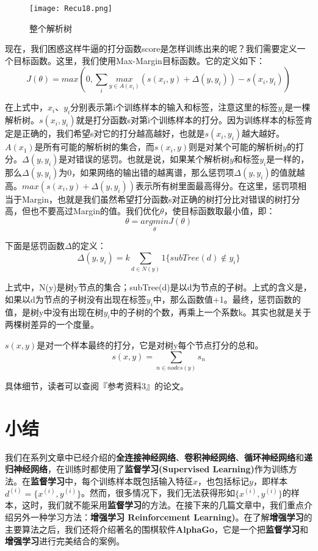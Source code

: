 \begin{figure}[!h]
	\centering
	\texttt{[image: Recu18.png]}
	\caption{整个解析树}
	\label{fig:Recu18}
\end{figure}

现在，我们困惑这样牛逼的打分函数score是怎样训练出来的呢？我们需要定义一个目标函数。这里，我们使用Max-Margin目标函数。它的定义如下：
\[
	J(\theta)=max(0, \sum_i\underset{y\in A(x_i)}{max}(s(x_i,y)+\Delta(y,y_i))-s(x_i,y_i))
\]

在上式中，\(x_i\)、\(y_i\)分别表示第i个训练样本的输入和标签，注意这里的标签\(y_i\)是一棵解析树。\(s(x_i,y_i)\)就是打分函数s对第i个训练样本的打分。因为训练样本的标签肯定是正确的，我们希望s对它的打分越高越好，也就是\(s(x_i,y_i)\)越大越好。\(A(x_1)\)是所有可能的解析树的集合，而\(s(x_i,y)\)则是对某个可能的解析树\(y\)的打分。\(\Delta(y,y_i)\)是对错误的惩罚。也就是说，如果某个解析树\(y\)和标签\(y_i\)是一样的，那么\(\Delta(y,y_i)\)为0，如果网络的输出错的越离谱，那么惩罚项\(\Delta(y,y_i)\)的值就越高。\(max(s(x_i,y)+\Delta(y,y_i))\)表示所有树里面最高得分。在这里，惩罚项相当于Margin，也就是我们虽然希望打分函数s对正确的树打分比对错误的树打分高，但也不要高过Margin的值。我们优化\(\theta\)，使目标函数取最小值，即：
\[
	\theta=\underset{\theta}{argmin}J(\theta)
\]

下面是惩罚函数\(\Delta\)的定义：
\[
	\Delta(y,y_i)=k\sum_{d\in N(y)}{1}{\{subTree(d)\notin y_i\}}
\]

上式中，N(y)是树y节点的集合；subTree(d)是以d为节点的子树。上式的含义是，如果以d为节点的子树没有出现在标签\(y_i\)中，那么函数值+1。最终，惩罚函数的值，是树y中没有出现在树\(y_i\)中的子树的个数，再乘上一个系数k。其实也就是关于两棵树差异的一个度量。

\(s(x,y)\)是对一个样本最终的打分，它是对树y每个节点打分的总和。
\[
	s(x,y)=\sum_{n\in nodes(y)}s_n
\]

具体细节，读者可以查阅『参考资料3』的论文。

\section{小结}

我们在系列文章中已经介绍的\textbf{全连接神经网络}、\textbf{卷积神经网络}、\textbf{循环神经网络}和\textbf{递归神经网络}，在训练时都使用了\textbf{监督学习(Supervised
	Learning)}作为训练方法。在\textbf{监督学习}中，每个训练样本既包括输入特征\({x}\)，也包括标记\({y}\)，即样本\(d^{(i)}=\{{x}^{(i)},{y}^{(i)}\}\)。然而，很多情况下，我们无法获得形如\(\{{x}^{(i)},{y}^{(i)}\}\)的样本，这时，我们就不能采用\textbf{监督学习}的方法。在接下来的几篇文章中，我们重点介绍另外一种学习方法：\textbf{增强学习 Reinforcement Learning)}。在了解\textbf{增强学习}的主要算法之后，我们还将介绍著名的围棋软件\textbf{AlphaGo}，它是一个把\textbf{监督学习}和\textbf{增强学习}进行完美结合的案例。

